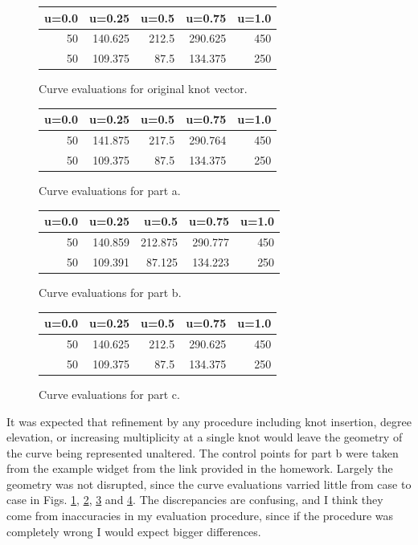 \documentclass[11pt,letterpaper]{article}
\begin{document}
\begin{figure}[!tbh]
\centering
\begin{tabular}{rrrrr}
\hline
   u=0.0 &   u=0.25 &   u=0.5 &   u=0.75 &   u=1.0 \\
\hline
      50 &  140.625 &   212.5 &  290.625 &     450 \\
      50 &  109.375 &    87.5 &  134.375 &     250 \\
\hline
\end{tabular}
\caption{Curve evaluations for original knot vector.}
\label{tab5}
\end{figure}

\begin{figure}[!tbh]
\centering
\begin{tabular}{rrrrr}
\hline
   u=0.0 &   u=0.25 &   u=0.5 &   u=0.75 &   u=1.0 \\
\hline
      50 &  141.875 &   217.5 &  290.764 &     450 \\
      50 &  109.375 &    87.5 &  134.375 &     250 \\
\hline
\end{tabular}
\caption{Curve evaluations for part a.}
\label{tab6}
\end{figure}

\begin{figure}[!tbh]
\centering
\begin{tabular}{rrrrr}
\hline
   u=0.0 &   u=0.25 &   u=0.5 &   u=0.75 &   u=1.0 \\
\hline
      50 &  140.859 & 212.875 &  290.777 &     450 \\
      50 &  109.391 &  87.125 &  134.223 &     250 \\
\hline
\end{tabular}
\caption{Curve evaluations for part b.}
\label{tab7}
\end{figure}

\begin{figure}[!tbh]
\centering
\begin{tabular}{rrrrr}
\hline
   u=0.0 &   u=0.25 &   u=0.5 &   u=0.75 &   u=1.0 \\
\hline
      50 &  140.625 &   212.5 &  290.625 &     450 \\
      50 &  109.375 &    87.5 &  134.375 &     250 \\
\hline
\end{tabular}
\caption{Curve evaluations for part c.}
\label{tab8}
\end{figure}

It was expected that refinement by any procedure including knot insertion, degree elevation, or increasing multiplicity at a single knot would leave the geometry of the curve being represented unaltered.
The control points for part b were taken from the example widget from the link provided in the homework. Largely the geometry was not disrupted, since the curve evaluations varried little from case to case in Figs. \ref{tab5}, \ref{tab6}, \ref{tab7} and \ref{tab8}.
The discrepancies are confusing, and I think they come from inaccuracies in my evaluation procedure, since if the procedure was completely wrong I would expect bigger differences. \\
\end{document}
